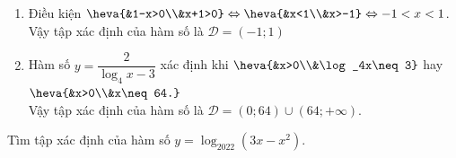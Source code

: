 \begin{ex}
{\begin{enumerate}
			Vậy tập  xác định của hàm số là $\mathscr{D}=(2;+\infty)\backslash\{3\}$
			\item Điều kiện  $\heva{&1-x>0\\&x+1>0}\Leftrightarrow\heva{&x<1\\&x>-1}\Leftrightarrow-1<x<1$.\\
			Vậy tập xác định của hàm số  là $\mathscr{D}=(-1;1)$
			\item Hàm số $y=\dfrac{2}{\log _4x-3}$ xác định khi $\heva{&x>0\\&\log _4x\neq 3}$ hay $\heva{&x>0\\&x\neq  64.}$\\
			Vậy tập xác  định của hàm số là $\mathscr{D}=(0;64)\cup(64;+\infty)$.
		\end{enumerate}
	} 
\end{ex}

\begin{ex}%
	Tìm  tập xác định của hàm số $y=\log_{2022} (3x-x^2)$.
\end{ex}

